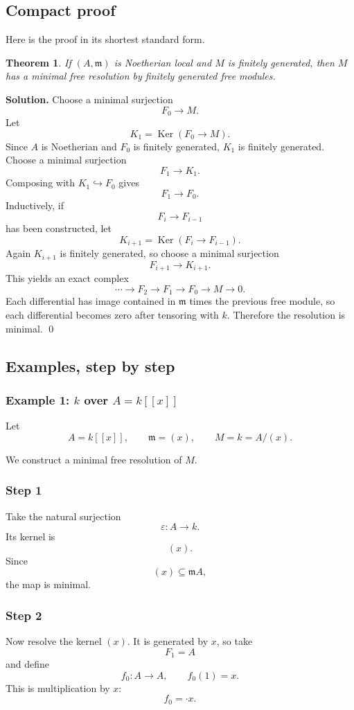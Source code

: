 \documentclass[12pt,a4paper]{article}
\theoremstyle{notespace}
\DeclareMathOperator{\Ker}{Ker}
\newtheorem{theorem}[definition]{Theorem}
\newcommand{\m}{\mathfrak m}
\begin{document}
\subsection{Compact proof}

Here is the proof in its shortest standard form.

\begin{theorem}
	If \((A,\m)\) is Noetherian local and \(M\) is finitely generated, then \(M\) has a minimal free resolution by finitely generated free modules.
\end{theorem}

\textbf{Solution.}
Choose a minimal surjection
\[
F_0\to M.
\]
Let
\[
K_1=\Ker(F_0\to M).
\]
Since \(A\) is Noetherian and \(F_0\) is finitely generated, \(K_1\) is finitely generated. Choose a minimal surjection
\[
F_1\to K_1.
\]
Composing with \(K_1\hookrightarrow F_0\) gives
\[
F_1\to F_0.
\]
Inductively, if
\[
F_i\to F_{i-1}
\]
has been constructed, let
\[
K_{i+1}=\Ker(F_i\to F_{i-1}).
\]
Again \(K_{i+1}\) is finitely generated, so choose a minimal surjection
\[
F_{i+1}\to K_{i+1}.
\]
This yields an exact complex
\[
\cdots \to F_2\to F_1\to F_0\to M\to 0.
\]
Each differential has image contained in \(\m\) times the previous free module, so each differential becomes zero after tensoring with \(k\). Therefore the resolution is minimal. \qed

\subsection{Examples, step by step}

\subsubsection{Example 1: \(k\) over \(A=k[[x]]\)}

Let
\[
A=k[[x]],\qquad \m=(x),\qquad M=k=A/(x).
\]

We construct a minimal free resolution of \(M\).

\subsubsection*{Step 1}
Take the natural surjection
\[
\varepsilon:A\to k.
\]
Its kernel is
\[
(x).
\]
Since
\[
(x)\subseteq \m A,
\]
the map is minimal.

\subsubsection*{Step 2}
Now resolve the kernel \((x)\). It is generated by \(x\), so take
\[
F_1=A
\]
and define
\[
f_0:A\to A,\qquad f_0(1)=x.
\]
This is multiplication by \(x\):
\[
f_0=\cdot x.
\]
\end{document}
